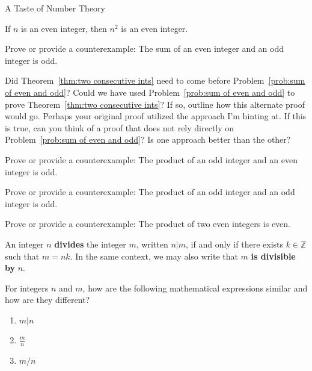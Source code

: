 \begin{section}{A Taste of Number Theory}
\begin{theorem}\label{thm:n even implies n^2 even}
If $n$ is an even integer, then $n^2$ is an even integer.
\end{theorem}

\begin{problem}\label{prob:sum of even and odd}
Prove or provide a counterexample:  The sum of an even integer and an odd integer is odd.
\end{problem}

\begin{question}
Did Theorem~\ref{thm:two consecutive ints} need to come before Problem~\ref{prob:sum of even and odd}?  Could we have used Problem~\ref{prob:sum of even and odd} to prove Theorem~\ref{thm:two consecutive ints}?  If so, outline how this alternate proof would go.  Perhaps your original proof utilized the approach I'm hinting at.  If this is true, can you think of a proof that does not rely directly on Problem~\ref{prob:sum of even and odd}?  Is one approach better than the other?
\end{question}

\begin{problem}
Prove or provide a counterexample: The product of an odd integer and an even integer is odd.
\end{problem}

\begin{problem}
Prove or provide a counterexample: The product of an odd integer and an odd integer is odd.
\end{problem}

\begin{problem}
Prove or provide a counterexample: The product of two even integers is even.
\end{problem}

\begin{definition}
An integer $n$ \textbf{divides} the integer $m$, written $n|m$, if and only if there exists $k\in\mathbb{Z}$ such that $m=nk$. In the same context, we may also write that $m$ \textbf{is divisible by} $n$.
\end{definition}

\begin{question}
For integers $n$ and $m$, how are the following mathematical expressions similar and how are they different?
\begin{enumerate}[label=\textrm{(\alph*)}]
\item $m|n$
\item $\displaystyle \frac{m}{n}$
\item $m/n$
\end{enumerate}
\end{question}


\end{section}
